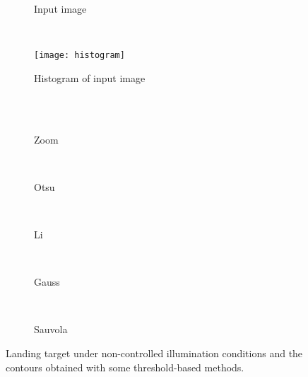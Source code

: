 \begin{figure}[!ht]
    \centering
    \begin{subfigure}[b]{0.3\textwidth}
        \caption{Input image}
        \label{fig:input_image}
    \end{subfigure}
    ~ %
    \begin{subfigure}[b]{0.3\textwidth}
        \texttt{[image: histogram]}
        \caption{Histogram of input image}
        \label{fig:histogram}
    \end{subfigure}\\
        ~ %
    \begin{subfigure}[b]{0.16\textwidth}
        \caption{Zoom}
        \label{fig:tar4_zoom}
    \end{subfigure}
        ~ %
    \begin{subfigure}[b]{0.16\textwidth}
        \caption{Otsu}
        \label{fig:otsu_th}
    \end{subfigure}
        ~ %
    \begin{subfigure}[b]{0.16\textwidth}
        \caption{Li}
        \label{fig:li_th}
    \end{subfigure}
        ~ %
    \begin{subfigure}[b]{0.16\textwidth}
        \caption{Gauss }
        \label{fig:gauss_th}
    \end{subfigure}
        ~ %
    \begin{subfigure}[b]{0.16\textwidth}
        \caption{Sauvola}
        \label{fig:sauvola_th}
    \end{subfigure}
    \caption{Landing target under non-controlled illumination conditions and the contours obtained with some threshold-based methods.}\label{fig:thresholding_comp}
\end{figure}

